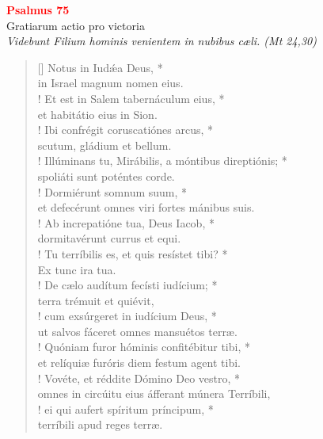 


\def\greinitialformat#1{%
{\fontsize{39}{39}\selectfont #1}%
}




\vspace{0.3cm}
\begin{center}
 \textcolor{red}{\large \bf Psalmus 75}\\
Gratiarum actio pro victoria\\
\textit{\small Videbunt Filium hominis venientem in nubibus cæli. (Mt 24,30)}
\end{center}
\begin{verse}[\versewidth]
Notus in Iud\'{æ}a Deus, *\\
in Israel magnum nomen eius.\\!
\vin Et est in Salem tabernáculum eius, *\\
\vin et habitátio eius in Sion.\\!
Ibi confrégit coruscatiónes arcus, *\\
scutum, gládium et bellum.\\!
\vin Illúminans tu, Mirábilis, a móntibus direptiónis; *\\
\vin spoliáti sunt poténtes corde.\\!
Dormiérunt somnum suum, *\\
et defecérunt omnes viri fortes mánibus suis.\\!
\vin Ab increpatióne tua, Deus Iacob, *\\
\vin dormitavérunt currus et equi.\\!
Tu terríbilis es, et quis resístet tibi? *\\
Ex tunc ira tua.\\!
\vin De cælo audítum fecísti iudícium; *\\
\vin terra trémuit et quiévit,\\!
cum exsúrgeret in iudícium Deus, *\\
ut salvos fáceret omnes mansuétos terræ.\\!
\vin Quóniam furor hóminis confitébitur tibi, *\\
\vin et relíquiæ furóris diem festum agent tibi.\\!
Vovéte, et réddite Dómino Deo vestro, *\\
omnes in circúitu eius áfferant múnera Terríbili,\\!
\vin ei qui aufert spíritum príncipum, *\\
\vin terríbili apud reges terræ.\\
\end{verse}
\vspace{1cm}


